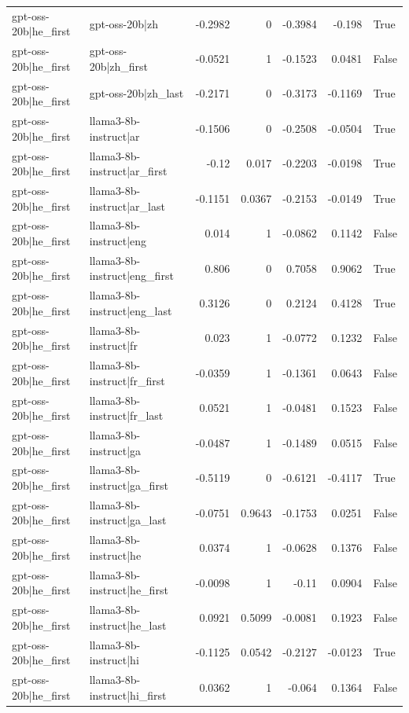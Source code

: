 \begin{table}
\begin{tabular}{l l r r r r l}
gpt-oss-20b|he_first & gpt-oss-20b|zh & -0.2982 & 0 & -0.3984 & -0.198 & True \\
gpt-oss-20b|he_first & gpt-oss-20b|zh_first & -0.0521 & 1 & -0.1523 & 0.0481 & False \\
gpt-oss-20b|he_first & gpt-oss-20b|zh_last & -0.2171 & 0 & -0.3173 & -0.1169 & True \\
gpt-oss-20b|he_first & llama3-8b-instruct|ar & -0.1506 & 0 & -0.2508 & -0.0504 & True \\
gpt-oss-20b|he_first & llama3-8b-instruct|ar_first & -0.12 & 0.017 & -0.2203 & -0.0198 & True \\
gpt-oss-20b|he_first & llama3-8b-instruct|ar_last & -0.1151 & 0.0367 & -0.2153 & -0.0149 & True \\
gpt-oss-20b|he_first & llama3-8b-instruct|eng & 0.014 & 1 & -0.0862 & 0.1142 & False \\
gpt-oss-20b|he_first & llama3-8b-instruct|eng_first & 0.806 & 0 & 0.7058 & 0.9062 & True \\
gpt-oss-20b|he_first & llama3-8b-instruct|eng_last & 0.3126 & 0 & 0.2124 & 0.4128 & True \\
gpt-oss-20b|he_first & llama3-8b-instruct|fr & 0.023 & 1 & -0.0772 & 0.1232 & False \\
gpt-oss-20b|he_first & llama3-8b-instruct|fr_first & -0.0359 & 1 & -0.1361 & 0.0643 & False \\
gpt-oss-20b|he_first & llama3-8b-instruct|fr_last & 0.0521 & 1 & -0.0481 & 0.1523 & False \\
gpt-oss-20b|he_first & llama3-8b-instruct|ga & -0.0487 & 1 & -0.1489 & 0.0515 & False \\
gpt-oss-20b|he_first & llama3-8b-instruct|ga_first & -0.5119 & 0 & -0.6121 & -0.4117 & True \\
gpt-oss-20b|he_first & llama3-8b-instruct|ga_last & -0.0751 & 0.9643 & -0.1753 & 0.0251 & False \\
gpt-oss-20b|he_first & llama3-8b-instruct|he & 0.0374 & 1 & -0.0628 & 0.1376 & False \\
gpt-oss-20b|he_first & llama3-8b-instruct|he_first & -0.0098 & 1 & -0.11 & 0.0904 & False \\
gpt-oss-20b|he_first & llama3-8b-instruct|he_last & 0.0921 & 0.5099 & -0.0081 & 0.1923 & False \\
gpt-oss-20b|he_first & llama3-8b-instruct|hi & -0.1125 & 0.0542 & -0.2127 & -0.0123 & True \\
gpt-oss-20b|he_first & llama3-8b-instruct|hi_first & 0.0362 & 1 & -0.064 & 0.1364 & False \\

\end{tabular}
\end{table}
